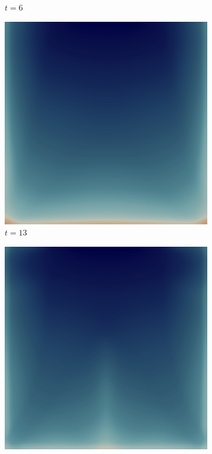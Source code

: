 \begin{figure}[H]
\begin{subfigure}{.4\textwidth}
        \caption{$t = 6$}
    \end{subfigure}
    \begin{subfigure}{.4\textwidth}
        \includegraphics[width=\textwidth]{imgs/UnitSquare1_State/third.png}
        \caption{$t = 13$}
    \end{subfigure}
    \begin{subfigure}{.4\textwidth}
        \includegraphics[width=\textwidth]{imgs/UnitSquare1_State/fourth.png}

\end{subfigure}
\end{figure}
